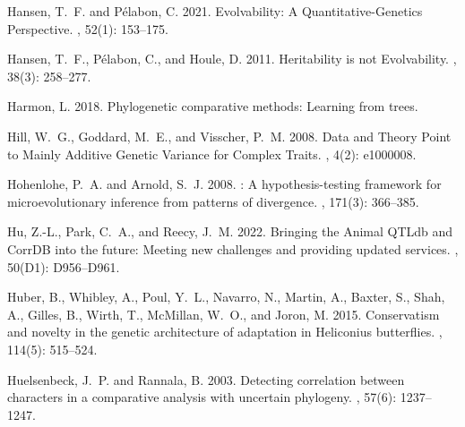 \documentclass{article}
\begin{document}
\begin{thebibliography}{}
    Hansen, T.~F. and P{\'e}labon, C. 2021.
    \newblock Evolvability: {{A Quantitative-Genetics Perspective}}.
    ,
        {52}(1): 153--175.

    Hansen, T.~F., P{\'e}labon, C., and Houle, D. 2011.
    \newblock Heritability is not {{Evolvability}}.
    , {38}(3): 258--277.

    Harmon, L. 2018.
    \newblock Phylogenetic comparative methods: Learning from trees.

    Hill, W.~G., Goddard, M.~E., and Visscher, P.~M. 2008.
    \newblock Data and {{Theory Point}} to {{Mainly Additive Genetic Variance}} for
        {{Complex Traits}}.
    , {4}(2): e1000008.

    Hohenlohe, P.~A. and Arnold, S.~J. 2008.
    : {{A}} hypothesis-testing framework for microevolutionary
    inference from patterns of divergence.
    , {171}(3): 366--385.

    Hu, Z.-L., Park, C.~A., and Reecy, J.~M. 2022.
    \newblock Bringing the {{Animal QTLdb}} and {{CorrDB}} into the future: Meeting
    new challenges and providing updated services.
    , {50}(D1): D956--D961.

    Huber, B., Whibley, A., Poul, Y.~L., Navarro, N., Martin, A., Baxter, S., Shah,
    A., Gilles, B., Wirth, T., McMillan, W.~O., and Joron, M. 2015.
    \newblock Conservatism and novelty in the genetic architecture of adaptation in
        {{Heliconius}} butterflies.
    , {114}(5): 515--524.

    Huelsenbeck, J.~P. and Rannala, B. 2003.
    \newblock Detecting correlation between characters in a comparative analysis
    with uncertain phylogeny.
    , {57}(6): 1237--1247.


\end{thebibliography}
\end{document}
